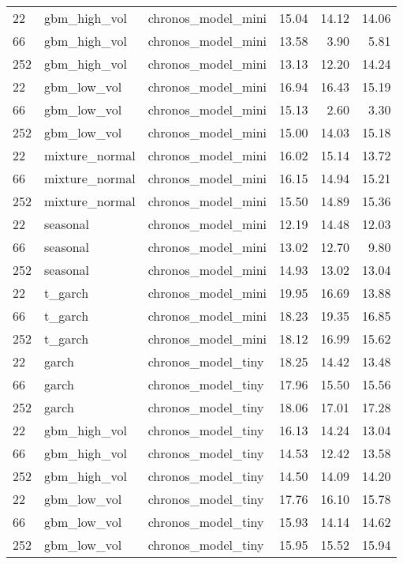 {\begin{tabular}{lllrrr}
\midrule
22 & gbm\_high\_vol & chronos\_model\_mini & 15.04 & 14.12 & 14.06 \\
66 & gbm\_high\_vol & chronos\_model\_mini & 13.58 & 3.90 & 5.81 \\
252 & gbm\_high\_vol & chronos\_model\_mini & 13.13 & 12.20 & 14.24 \\
\midrule
22 & gbm\_low\_vol & chronos\_model\_mini & 16.94 & 16.43 & 15.19 \\
66 & gbm\_low\_vol & chronos\_model\_mini & 15.13 & 2.60 & 3.30 \\
252 & gbm\_low\_vol & chronos\_model\_mini & 15.00 & 14.03 & 15.18 \\
\midrule
22 & mixture\_normal & chronos\_model\_mini & 16.02 & 15.14 & 13.72 \\
66 & mixture\_normal & chronos\_model\_mini & 16.15 & 14.94 & 15.21 \\
252 & mixture\_normal & chronos\_model\_mini & 15.50 & 14.89 & 15.36 \\
\midrule
22 & seasonal & chronos\_model\_mini & 12.19 & 14.48 & 12.03 \\
66 & seasonal & chronos\_model\_mini & 13.02 & 12.70 & 9.80 \\
252 & seasonal & chronos\_model\_mini & 14.93 & 13.02 & 13.04 \\
\midrule
22 & t\_garch & chronos\_model\_mini & 19.95 & 16.69 & 13.88 \\
66 & t\_garch & chronos\_model\_mini & 18.23 & 19.35 & 16.85 \\
252 & t\_garch & chronos\_model\_mini & 18.12 & 16.99 & 15.62 \\
\midrule
22 & garch & chronos\_model\_tiny & 18.25 & 14.42 & 13.48 \\
66 & garch & chronos\_model\_tiny & 17.96 & 15.50 & 15.56 \\
252 & garch & chronos\_model\_tiny & 18.06 & 17.01 & 17.28 \\
\midrule
22 & gbm\_high\_vol & chronos\_model\_tiny & 16.13 & 14.24 & 13.04 \\
66 & gbm\_high\_vol & chronos\_model\_tiny & 14.53 & 12.42 & 13.58 \\
252 & gbm\_high\_vol & chronos\_model\_tiny & 14.50 & 14.09 & 14.20 \\
\midrule
22 & gbm\_low\_vol & chronos\_model\_tiny & 17.76 & 16.10 & 15.78 \\
66 & gbm\_low\_vol & chronos\_model\_tiny & 15.93 & 14.14 & 14.62 \\
252 & gbm\_low\_vol & chronos\_model\_tiny & 15.95 & 15.52 & 15.94 \\

\end{tabular}}
